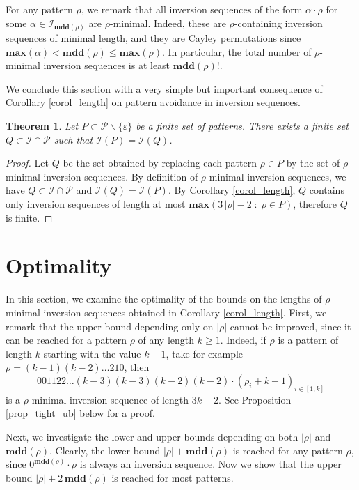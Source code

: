 \documentclass[a4paper,11pt]{article}
\newtheorem{thm}{Theorem}
\theoremstyle{definition}
\theoremstyle{remark}
\newcommand{\I}{\mathcal{I}}
\renewcommand{\P}{\mathcal{P}}
\renewcommand{\max}{\mathbf{max}}
\newcommand{\mdd}{\mathbf{mdd}}
\begin{document}
For any pattern $\rho$, we remark that all inversion sequences of the form $\alpha \cdot \rho$ for some ${\alpha \in \I_{\mdd(\rho)}}$ are $\rho$-minimal. Indeed, these are $\rho$-containing inversion sequences of minimal length, and they are Cayley permutations since $\max(\alpha) < \mdd(\rho) \leq \max(\rho)$. In particular, the total number of $\rho$-minimal inversion sequences is at least $\mdd(\rho)!$.

We conclude this section with a very simple but important consequence of Corollary \ref{corol_length} on pattern avoidance in inversion sequences.

\begin{thm}
    Let $P \subset \P \backslash \{\varepsilon\}$ be a finite set of patterns. There exists a finite set $Q \subset \I \cap \P$ such that $\I(P) = \I(Q)$.
\end{thm}
\begin{proof}
    Let $Q$ be the set obtained by replacing each pattern $\rho \in P$ by the set of $\rho$-minimal inversion sequences. By definition of $\rho$-minimal inversion sequences, we have $Q \subset \I \cap \P$ and $\I(Q) = \I(P)$. By Corollary \ref{corol_length}, $Q$ contains only inversion sequences of length at most $\max(3 \, |\rho| - 2 \; : \; \rho \in P)$, therefore $Q$ is finite.
\end{proof}

\section{Optimality} \label{sec_optimality}
In this section, we examine the optimality of the bounds on the lengths of $\rho$-minimal inversion sequences obtained in Corollary \ref{corol_length}. First, we remark that the upper bound depending only on $|\rho|$ cannot be improved, since it can be reached for a pattern $\rho$ of any length $k \geq 1$. Indeed, if $\rho$ is a pattern of length $k$ starting with the value $k-1$, take for example $\rho = (k-1)(k-2) \dots 210$, then
$$001122\dots (k-3)(k-3)(k-2)(k-2) \cdot (\rho_i + k-1)_{i \in [1,k]}$$
is a $\rho$-minimal inversion sequence of length $3k-2$. See Proposition \ref{prop_tight_ub} below for a proof.

Next, we investigate the lower and upper bounds depending on both $|\rho|$ and $\mdd(\rho)$. Clearly, the lower bound $|\rho| + \mdd(\rho)$ is reached for any pattern $\rho$, since $0^{\mdd(\rho)} \cdot \rho$ is always an inversion sequence. Now we show that the upper bound $|\rho| + 2\,\mdd(\rho)$ is reached for most patterns.
\end{document}

